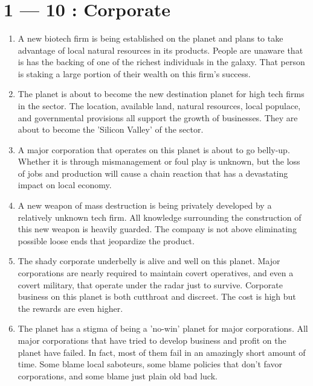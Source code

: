 \documentclass{article}
\begin{document}
\title{\vspace{-0.5cm}{\Huge Star Wars World Secrets} \vspace{-1cm}}

\date{}

\maketitle

\section*{1 --- 10 : Corporate}
\begin{enumerate}
	\item A new biotech firm is being established on the planet and plans to take advantage of local natural resources in its products. People are unaware that is has the backing of one of the richest individuals in the galaxy. That person is staking a large portion of their wealth on this firm’s success.
	\item The planet is about to become the new destination planet for high tech firms in the sector. The location, available land, natural resources, local populace, and governmental provisions all support the growth of businesses. They are about to become the 'Silicon Valley’ of the sector.
	\item A major corporation that operates on this planet is about to go belly-up. Whether it is through mismanagement or foul play is unknown, but the loss of jobs and production will cause a chain reaction that has a devastating impact on local economy.
	\item A new weapon of mass destruction is being privately developed by a relatively unknown tech firm. All knowledge surrounding the construction of this new weapon is heavily guarded. The company is not above eliminating possible loose ends that jeopardize the product.
	\item The shady corporate underbelly is alive and well on this planet. Major corporations are nearly required to maintain covert operatives, and even a covert military, that operate under the radar just to survive. Corporate business on this planet is both cutthroat and discreet. The cost is high but the rewards are even higher.
	\item The planet has a stigma of being a 'no-win’ planet for major corporations. All major corporations that have tried to develop business and profit on the planet have failed. In fact, most of them fail in an amazingly short amount of time. Some blame local saboteurs, some blame policies that don’t favor corporations, and some blame just plain old bad luck.

\end{enumerate}
\end{document}
